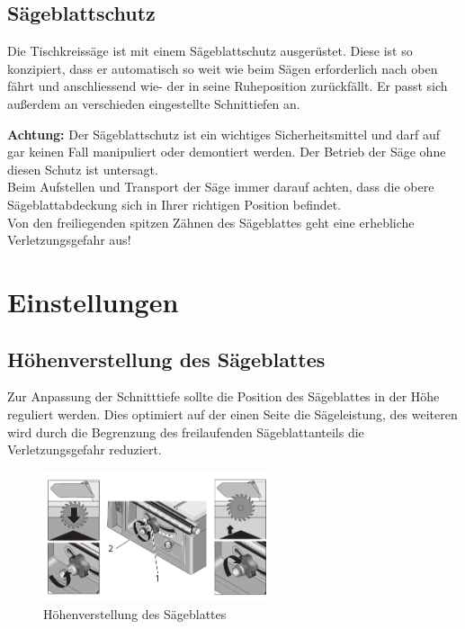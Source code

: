 \documentclass{\basedir/fablab-document}
\begin{document}
\subsection{Sägeblattschutz}

Die Tischkreissäge ist mit einem Sägeblattschutz ausgerüstet. Diese ist so konzipiert, dass er automatisch so weit wie beim Sägen erforderlich nach oben fährt und anschliessend wie-
der in seine Ruheposition zurückfällt. Er passt sich außerdem an verschieden eingestellte Schnittiefen an.

\textbf{Achtung:} 
Der Sägeblattschutz ist ein wichtiges Sicherheitsmittel und darf auf gar keinen Fall manipuliert oder demontiert werden. Der Betrieb der Säge ohne diesen Schutz ist untersagt. \\
Beim Aufstellen und Transport der Säge immer darauf achten, dass die obere Sägeblattabdeckung sich in Ihrer richtigen Position befindet. \\
Von den freiliegenden spitzen Zähnen des Sägeblattes geht eine erhebliche Verletzungsgefahr aus!


\section{Einstellungen}
\subsection{Höhenverstellung des Sägeblattes}

Zur Anpassung der Schnitttiefe sollte die Position des Sägeblattes in der Höhe reguliert werden. Dies optimiert auf der einen Seite die Sägeleistung, des weiteren wird durch die Begrenzung des freilaufenden Sägeblattanteils die Verletzungsgefahr reduziert.

\begin{figure} 
	\centering
	\includegraphics[width=0.6\textwidth]{bilder/saegeverstellung.pdf}
	\caption{Höhenverstellung des Sägeblattes}
	\label{fig:verstellung}
\end{figure}
\end{document}
